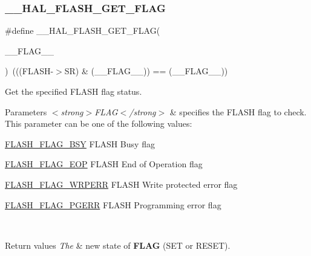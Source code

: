 \subsubsection{\texorpdfstring{\+\_\+\+\_\+\+H\+A\+L\+\_\+\+F\+L\+A\+S\+H\+\_\+\+G\+E\+T\+\_\+\+F\+L\+AG}{\_\_HAL\_FLASH\_GET\_FLAG}}
{\footnotesize\ttfamily \#define \+\_\+\+\_\+\+H\+A\+L\+\_\+\+F\+L\+A\+S\+H\+\_\+\+G\+E\+T\+\_\+\+F\+L\+AG(\begin{DoxyParamCaption}\item[{}]{\+\_\+\+\_\+\+F\+L\+A\+G\+\_\+\+\_\+ }\end{DoxyParamCaption})~(((F\+L\+A\+SH-\/$>$SR) \& (\+\_\+\+\_\+\+F\+L\+A\+G\+\_\+\+\_\+)) == (\+\_\+\+\_\+\+F\+L\+A\+G\+\_\+\+\_\+))}



Get the specified F\+L\+A\+SH flag status. 


\begin{DoxyParams}{Parameters}
{\em $<$strong$>$\+F\+L\+A\+G$<$/strong$>$} & specifies the F\+L\+A\+SH flag to check. This parameter can be one of the following values\+: \begin{DoxyItemize}
\item \hyperlink{group___f_l_a_s_h___flag__definition_gad3bc368f954ad7744deda3315da2fff7}{F\+L\+A\+S\+H\+\_\+\+F\+L\+A\+G\+\_\+\+B\+SY} F\+L\+A\+SH Busy flag \item \hyperlink{group___f_l_a_s_h___flag__definition_gaf043ba4d8f837350bfc7754a99fae5a9}{F\+L\+A\+S\+H\+\_\+\+F\+L\+A\+G\+\_\+\+E\+OP} F\+L\+A\+SH End of Operation flag \item \hyperlink{group___f_l_a_s_h___flag__definition_ga6abf64f916992585899369166db3f266}{F\+L\+A\+S\+H\+\_\+\+F\+L\+A\+G\+\_\+\+W\+R\+P\+E\+RR} F\+L\+A\+SH Write protected error flag \item \hyperlink{group___f_l_a_s_h___flag__definition_gae2ef62dee0a5ca01e6226746039b6f20}{F\+L\+A\+S\+H\+\_\+\+F\+L\+A\+G\+\_\+\+P\+G\+E\+RR} F\+L\+A\+SH Programming error flag \end{DoxyItemize}
\\
\hline
\end{DoxyParams}

\begin{DoxyRetVals}{Return values}
{\em The} & new state of {\bfseries F\+L\+AG} (S\+ET or R\+E\+S\+ET). \\
\hline
\end{DoxyRetVals}
